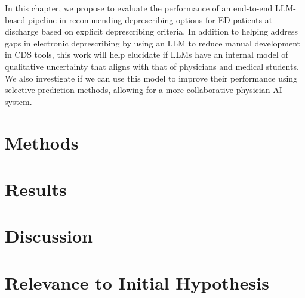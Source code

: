 In this chapter, we propose to evaluate the performance of an end-to-end LLM-based pipeline in recommending deprescribing options for ED patients at discharge based on explicit deprescribing criteria. In addition to helping address gaps in electronic deprescribing by using an LLM to reduce manual development in CDS tools, this work will  help elucidate if LLMs have an internal model of qualitative uncertainty that aligns with that of physicians and medical students. We also investigate if we can use this model to improve their performance using selective prediction methods, allowing for a more collaborative physician-AI system.

\section{Methods}

\section{Results}
\section{Discussion}
\section{Relevance to Initial Hypothesis}
